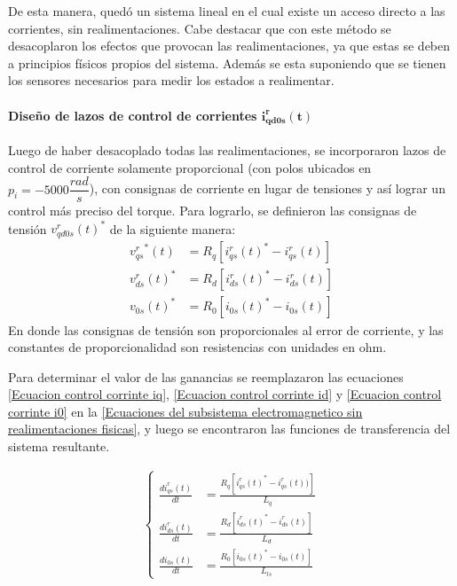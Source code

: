 \documentclass[a4paper, 10pt, onecolumn,journal]{ieeeconf}
\begin{document}
De esta manera, quedó un sistema lineal en el cual existe un acceso directo a las corrientes, sin realimentaciones. Cabe destacar que con este método se desacoplaron los efectos que provocan las realimentaciones, ya que  estas se deben a principios físicos propios del sistema. Además se esta suponiendo que se tienen los sensores necesarios para medir los estados a realimentar.

\paragraph{\textbf{Diseño de lazos de control de corrientes $\mathbf{{i}^r_{qd0s}(t)}$}}
Luego de haber desacoplado todas las realimentaciones, se incorporaron lazos de control de corriente solamente proporcional (con polos ubicados en $p_{i}=-5000\dfrac{rad}{s}$), con consignas de corriente en lugar de tensiones y así lograr un control más preciso del torque.
Para lograrlo, se definieron las consignas de tensión  ${v^r_{qd0s}(t)}^*$ de la siguiente manera:
 \begin{align}
	{v^r_{qs}}^*(t) &= R_q \left[ {i^r_{qs}(t)}^* - i^r_{qs}(t) \right] \label{Ecuacion control corrinte iq}\\
	{v^r_{ds}(t)}^* &= R_d \left[ {i^r_{ds}(t)}^* - i^r_{ds}(t) \right] \label{Ecuacion control corrinte id}\\ 
	{v_{0s}(t)}^*   &= R_0 \left[ {i_{0s}(t)}^* - i_{0s}(t) \right] \label{Ecuacion control corrinte i0}
\end{align}
En donde las consignas de tensión son proporcionales al error de corriente, y las constantes de proporcionalidad son resistencias con unidades en ohm.

Para determinar el valor de las ganancias se reemplazaron las ecuaciones \eqref{Ecuacion control corrinte iq}, \eqref{Ecuacion control corrinte id} y \eqref{Ecuacion control corrinte i0} en la \cref{Ecuaciones del subsistema electromagnetico sin realimentaciones fisicas}, y luego se encontraron las funciones de transferencia del sistema resultante.

\begin{align}
	\begin{cases}
		\frac{d i^r_{qs}(t)}{dt} &= \frac{ R_q \left[ {i^r_{qs}(t)}^* - i^r_{qs}(t))\right]}{L_q}\\
		\frac{d i^r_{ds}(t)}{dt} &= \frac{R_d \left[ {i^r_{ds}(t)}^* - i^r_{ds}(t) \right]}{L_d} \\ 
		\frac{d i_{0s}(t)}{dt}   &= \frac{R_0 \left[ {i_{0s}(t)}^* - i_{0s}(t) \right]}{L_{ls}}
	\end{cases}	\label{Ecuaciones lazos de control de corriente}
\end{align}
\end{document}
